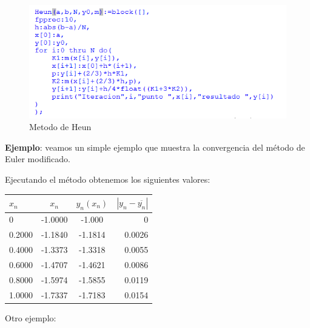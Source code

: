 \documentclass[paper=a4, fontsize=11pt]{scrartcl} %
\numberwithin{equation}{section}
\begin{document}
	\begin{figure}[H]
		\includegraphics[width=1\textwidth]{heun.png}
		\caption{Metodo de Heun}
		\label{fig:Heun}
	\end{figure}
	
	
	\textbf{Ejemplo}: veamos un simple ejemplo que muestra la convergencia del método de Euler modificado.
	\begin{center}
	\end{center}
	Ejecutando el método obtenemos los siguientes valores:\\
	\begin{tabular}[t]{|l |c | c |r|}
		\hline
		$x_n$ & $x_n$ & $y_n(x_n)$ & $|y_n - \overline{y_n}|$ \\
		\hline
		0 & -1.0000 & -1.000 & 0\\
		\hline
		0.2000 & -1.1840 & -1.1814 & 0.0026 \\
		\hline
		0.4000 & -1.3373 & -1.3318 & 0.0055\\
		\hline
		0.6000 & -1.4707 & -1.4621 & 0.0086\\
		\hline
		0.8000 & -1.5974 & -1.5855 & 0.0119\\
		\hline
		1.0000 & -1.7337 & -1.7183 & 0.0154\\
		\hline
	\end{tabular}\newline
	
	Otro ejemplo:
	\begin{center}
	\end{center}
	
\end{document}
